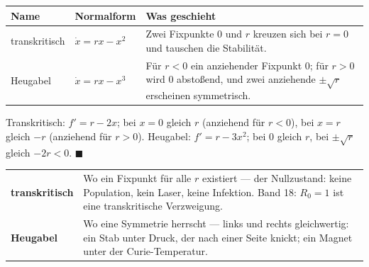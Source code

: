 \begin{merksatz}
\begin{center}
{\small
\renewcommand{\arraystretch}{1.5}
\begin{tabular}{@{}P{2.4cm}P{2.4cm}P{4.0cm}@{}}
\toprule
\textbf{Name} & \textbf{Normalform} & \textbf{Was geschieht}\\
\midrule
transkritisch & $\dot x = rx - x^{2}$ & Zwei Fixpunkte $0$ und $r$ kreuzen sich bei $r = 0$ und tauschen die Stabilität.\\
Heugabel & $\dot x = rx - x^{3}$ & Für $r<0$ ein anziehender Fixpunkt $0$; für $r>0$ wird $0$ abstoßend, und zwei anziehende $\pm\sqrt r$ erscheinen symmetrisch.\\
\bottomrule
\end{tabular}}
\end{center}

Transkritisch: $f' = r - 2x$; bei $x=0$ gleich $r$ (anziehend für $r<0$), bei $x=r$ gleich $-r$ (anziehend für $r>0$). Heugabel: $f' = r - 3x^{2}$; bei $0$ gleich $r$, bei $\pm\sqrt r$ gleich $-2r < 0$. $\blacksquare$

\begin{center}
{\small
\renewcommand{\arraystretch}{1.5}
\begin{tabular}{@{}P{2.4cm}P{6.4cm}@{}}
\toprule
\textbf{transkritisch} & Wo ein Fixpunkt für alle $r$ existiert --- der Nullzustand: keine Population, kein Laser, keine Infektion. Band 18: $R_0 = 1$ ist eine transkritische Verzweigung.\\
\textbf{Heugabel} & Wo eine Symmetrie herrscht --- links und rechts gleichwertig: ein Stab unter Druck, der nach einer Seite knickt; ein Magnet unter der Curie-Temperatur.\\
\bottomrule
\end{tabular}}
\end{center}

\begin{center}
\begin{minipage}{0.88\textwidth}
\end{minipage}
\end{center}
\end{merksatz}

